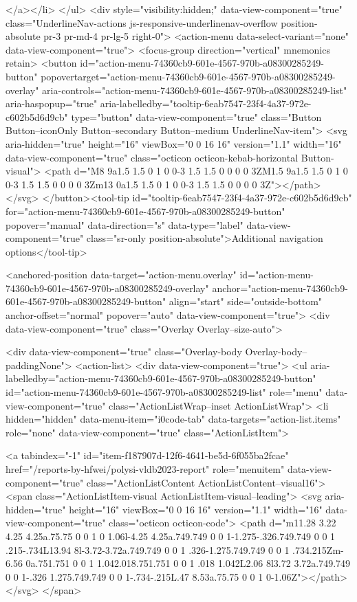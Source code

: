 {{    
</a></li>
</ul>
    <div style="visibility:hidden;" data-view-component="true" class="UnderlineNav-actions js-responsive-underlinenav-overflow position-absolute pr-3 pr-md-4 pr-lg-5 right-0">      <action-menu data-select-variant="none" data-view-component="true">
  <focus-group direction="vertical" mnemonics retain>
    <button id="action-menu-74360cb9-601e-4567-970b-a08300285249-button" popovertarget="action-menu-74360cb9-601e-4567-970b-a08300285249-overlay" aria-controls="action-menu-74360cb9-601e-4567-970b-a08300285249-list" aria-haspopup="true" aria-labelledby="tooltip-6eab7547-23f4-4a37-972e-c602b5d6d9cb" type="button" data-view-component="true" class="Button Button--iconOnly Button--secondary Button--medium UnderlineNav-item">  <svg aria-hidden="true" height="16" viewBox="0 0 16 16" version="1.1" width="16" data-view-component="true" class="octicon octicon-kebab-horizontal Button-visual">
    <path d="M8 9a1.5 1.5 0 1 0 0-3 1.5 1.5 0 0 0 0 3ZM1.5 9a1.5 1.5 0 1 0 0-3 1.5 1.5 0 0 0 0 3Zm13 0a1.5 1.5 0 1 0 0-3 1.5 1.5 0 0 0 0 3Z"></path>
</svg>
</button><tool-tip id="tooltip-6eab7547-23f4-4a37-972e-c602b5d6d9cb" for="action-menu-74360cb9-601e-4567-970b-a08300285249-button" popover="manual" data-direction="s" data-type="label" data-view-component="true" class="sr-only position-absolute">Additional navigation options</tool-tip>


<anchored-position data-target="action-menu.overlay" id="action-menu-74360cb9-601e-4567-970b-a08300285249-overlay" anchor="action-menu-74360cb9-601e-4567-970b-a08300285249-button" align="start" side="outside-bottom" anchor-offset="normal" popover="auto" data-view-component="true">
  <div data-view-component="true" class="Overlay Overlay--size-auto">
    
      <div data-view-component="true" class="Overlay-body Overlay-body--paddingNone">          <action-list>
  <div data-view-component="true">
    <ul aria-labelledby="action-menu-74360cb9-601e-4567-970b-a08300285249-button" id="action-menu-74360cb9-601e-4567-970b-a08300285249-list" role="menu" data-view-component="true" class="ActionListWrap--inset ActionListWrap">
        <li hidden="hidden" data-menu-item="i0code-tab" data-targets="action-list.items" role="none" data-view-component="true" class="ActionListItem">
    
    
    <a tabindex="-1" id="item-f187907d-12f6-4641-be5d-6f055ba2fcae" href="/reports-by-hfwei/polysi-vldb2023-report" role="menuitem" data-view-component="true" class="ActionListContent ActionListContent--visual16">
        <span class="ActionListItem-visual ActionListItem-visual--leading">
          <svg aria-hidden="true" height="16" viewBox="0 0 16 16" version="1.1" width="16" data-view-component="true" class="octicon octicon-code">
    <path d="m11.28 3.22 4.25 4.25a.75.75 0 0 1 0 1.06l-4.25 4.25a.749.749 0 0 1-1.275-.326.749.749 0 0 1 .215-.734L13.94 8l-3.72-3.72a.749.749 0 0 1 .326-1.275.749.749 0 0 1 .734.215Zm-6.56 0a.751.751 0 0 1 1.042.018.751.751 0 0 1 .018 1.042L2.06 8l3.72 3.72a.749.749 0 0 1-.326 1.275.749.749 0 0 1-.734-.215L.47 8.53a.75.75 0 0 1 0-1.06Z"></path>
</svg>
        </span>
      
}}
